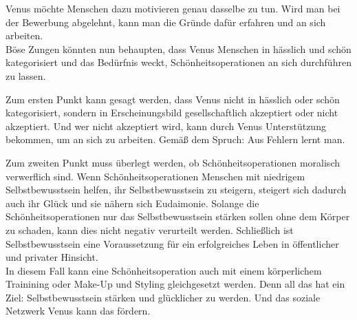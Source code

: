 Venus möchte Menschen dazu motivieren genau dasselbe zu tun. Wird man bei der Bewerbung abgelehnt, kann man die Gründe dafür erfahren und an sich arbeiten.\\
Böse Zungen könnten nun behaupten, dass Venus Menschen in hässlich und schön kategorisiert und das Bedürfnis weckt, Schönheitsoperationen an sich durchführen zu lassen.

Zum ersten Punkt kann gesagt werden, dass Venus nicht in hässlich oder schön kategorisiert, sondern in Erscheinungsbild gesellschaftlich akzeptiert oder nicht akzeptiert. Und wer nicht akzeptiert wird, kann durch Venus Unterstützung bekommen, um an sich zu arbeiten. Gemäß dem Spruch: \glqq Aus Fehlern lernt man\grqq.

Zum zweiten Punkt muss überlegt werden, ob Schönheitsoperationen moralisch verwerflich sind.
Wenn Schönheitsoperationen Menschen mit niedrigem Selbstbewusstsein helfen, ihr Selbstbewusstsein zu steigern, steigert sich dadurch auch ihr Glück und sie nähern sich Eudaimonie. Solange die Schönheitsoperationen nur das Selbstbewusstsein stärken sollen ohne dem Körper zu schaden, kann dies nicht negativ verurteilt werden. Schließlich ist Selbstbewusstsein eine Voraussetzung für ein erfolgreiches Leben  in öffentlicher und privater Hinsicht.\\
In diesem Fall kann eine Schönheitsoperation auch mit einem körperlichem Trainining oder Make-Up und Styling gleichgesetzt werden. Denn all das hat ein Ziel: Selbstbewusstsein stärken und glücklicher zu werden. Und das soziale Netzwerk Venus kann das fördern.
